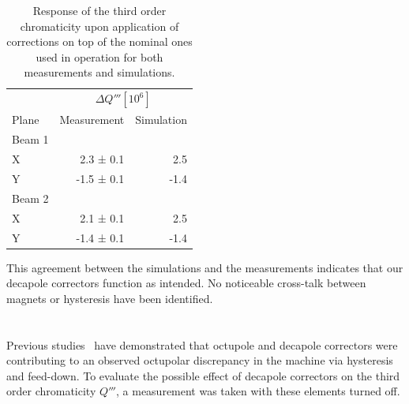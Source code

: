   
  \begin{table}[H]
    \centering
    \begin{tabular}{lrr}
      \toprule
           & \multicolumn{2}{c}{$\Delta Q''' [10^6]$}\\
       Plane         & Measurement   & Simulation \\
      \midrule
        Beam 1  &    & \\
        \hspace{2mm}X       &  2.3 ± 0.1 &   2.5 \\
        \hspace{2mm}Y       & -1.5 ± 0.1 &  -1.4 \\
        Beam 2  &            &  \\
        \hspace{2mm}X       & 2.1 ± 0.1  &  2.5\\
        \hspace{2mm}Y       & -1.4 ± 0.1 & -1.4\\
        \bottomrule
    \end{tabular}
    \caption{Response of the third order chromaticity upon application of corrections on top of the
    nominal ones used in operation for both measurements and simulations.}
    \label{table:decapoles:chromaticity:dq3_before_after_beam_based_response}
  \end{table}


This agreement between the simulations and the measurements indicates that our decapole correctors
function as intended. No noticeable cross-talk between magnets or hysteresis have been identified.



\section{}



Previous studies~\cite{maclean_measurement_2014} have demonstrated that octupole and decapole
correctors were contributing to an observed octupolar discrepancy in the machine via hysteresis and
feed-down. To evaluate the possible effect of decapole correctors on the third order chromaticity
$Q'''$, a measurement was taken with these elements turned off.

